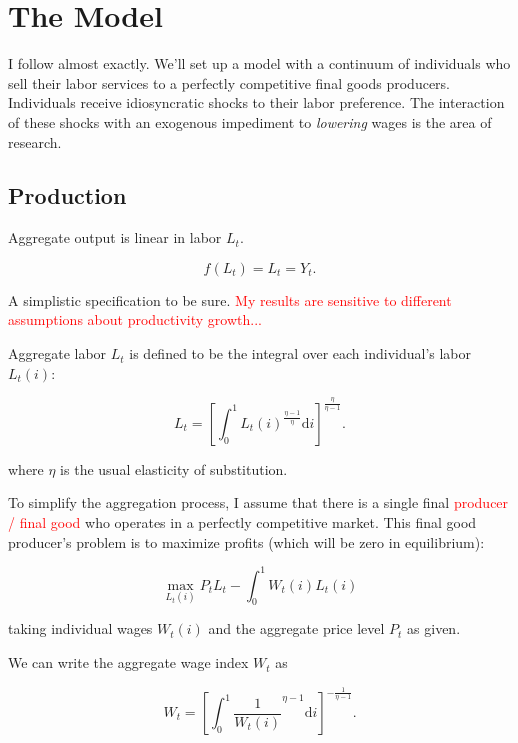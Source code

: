 \documentclass[12pt,a4paper]{scrartcl}            %
\begin{document}
\section{The Model}
\label{sec:the_model}

I follow \cite{daly_hobijn_2013} almost exactly.  We'll set up a model with a continuum of individuals who sell their labor services to a perfectly competitive final goods producers.  Individuals receive idiosyncratic shocks to their labor preference. The interaction of these shocks with an exogenous impediment to \emph{lowering} wages is the area of research.

\subsection{Production}
\label{sub:production}


Aggregate output is linear in labor $L_t$.

\begin{equation} \label{eq:agg_output}
    f(L_t) = L_t = Y_t.
\end{equation}

A simplistic specification to be sure.  \textcolor{red}{My results are sensitive to different assumptions about productivity growth...}

Aggregate labor \(L_t\) is defined to be the integral over each individual's labor \(L_t(i)\):

\begin{equation} \label{eq:agg_labor}
    L_t = \left[ \int_0^1 L_t(i)^{\frac{\eta - 1}{\eta}} \mathrm{d}i \right]^{\frac{\eta}{\eta - 1}}.
\end{equation}

where $\eta$ is the usual elasticity of substitution.

To simplify the aggregation process, I assume that there is a single final \textcolor{red}{producer / final good} who operates in a perfectly competitive market.
This final good producer's problem is to maximize profits (which will be zero in equilibrium):

\begin{equation} \label{eq:firms_problem}
    \max_{L_t(i)} P_t L_t - \int_0^1 W_t(i)L_t(i)
\end{equation}

taking individual wages $W_t(i)$ and the aggregate price level $P_t$ as given.

We can write the aggregate wage index $W_t$ as

\begin{equation} \label{eq:wage_index}
    W_t = \left[\int_{0}^{1}\frac{1}{W_t(i)}^{\eta - 1} \mathrm{d}i \right]^{-\frac{1}{\eta - 1}}.
\end{equation}
\end{document}
